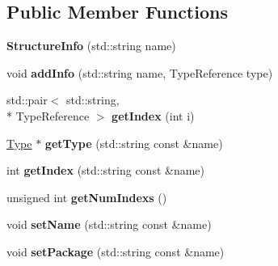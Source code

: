 \subsection*{Public Member Functions}
\begin{DoxyCompactItemize}
\item 
\hypertarget{class_scribble_core_1_1_structure_info_a1c721c66301d3669baa7bdf6f86b4ce8}{{\bfseries Structure\-Info} (std\-::string name)}\label{class_scribble_core_1_1_structure_info_a1c721c66301d3669baa7bdf6f86b4ce8}

\item 
\hypertarget{class_scribble_core_1_1_structure_info_aabff56fd1c8718de21cdf48fe2a8b6e2}{void {\bfseries add\-Info} (std\-::string name, Type\-Reference type)}\label{class_scribble_core_1_1_structure_info_aabff56fd1c8718de21cdf48fe2a8b6e2}

\item 
\hypertarget{class_scribble_core_1_1_structure_info_a3908314d044d793bedc22dbd859f3c18}{std\-::pair$<$ std\-::string, \\*
Type\-Reference $>$ {\bfseries get\-Index} (int i)}\label{class_scribble_core_1_1_structure_info_a3908314d044d793bedc22dbd859f3c18}

\item 
\hypertarget{class_scribble_core_1_1_structure_info_af323b69f12f56ad5efbf6dd6041a9f6f}{\hyperlink{class_scribble_core_1_1_type}{Type} $\ast$ {\bfseries get\-Type} (std\-::string const \&name)}\label{class_scribble_core_1_1_structure_info_af323b69f12f56ad5efbf6dd6041a9f6f}

\item 
\hypertarget{class_scribble_core_1_1_structure_info_aaee1675566b39d5edf65cc8884805aaf}{int {\bfseries get\-Index} (std\-::string const \&name)}\label{class_scribble_core_1_1_structure_info_aaee1675566b39d5edf65cc8884805aaf}

\item 
\hypertarget{class_scribble_core_1_1_structure_info_a3ad5e3e1f898a544eead94dfab83dbec}{unsigned int {\bfseries get\-Num\-Indexs} ()}\label{class_scribble_core_1_1_structure_info_a3ad5e3e1f898a544eead94dfab83dbec}

\item 
\hypertarget{class_scribble_core_1_1_structure_info_a6c8395d0e3a8a2c26ab15df4439e13e4}{void {\bfseries set\-Name} (std\-::string const \&name)}\label{class_scribble_core_1_1_structure_info_a6c8395d0e3a8a2c26ab15df4439e13e4}

\item 
\hypertarget{class_scribble_core_1_1_structure_info_a77e7bc5dff5c89c0f765c25280e2b9d7}{void {\bfseries set\-Package} (std\-::string const \&name)}\label{class_scribble_core_1_1_structure_info_a77e7bc5dff5c89c0f765c25280e2b9d7}


\end{DoxyCompactItemize}
